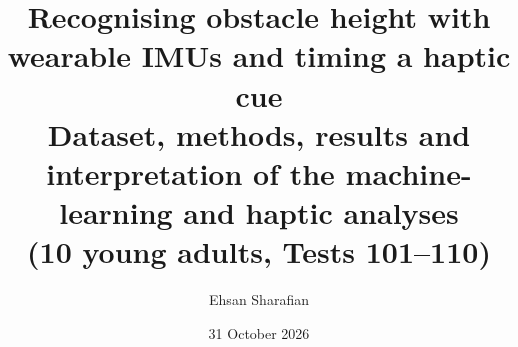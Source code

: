 \documentclass[11pt,a4paper]{article}
\title{\textbf{Recognising obstacle height with wearable IMUs and timing a haptic cue}\\[4pt]
\large Dataset, methods, results and interpretation of the machine-learning and haptic analyses\\ (10 young adults, Tests 101--110)}
\author{Ehsan Sharafian}
\date{31 October 2026}
\begin{document}
\maketitle

\begin{abstract}

\end{abstract}

\tableofcontents
\newpage








\appendix

\end{document}
